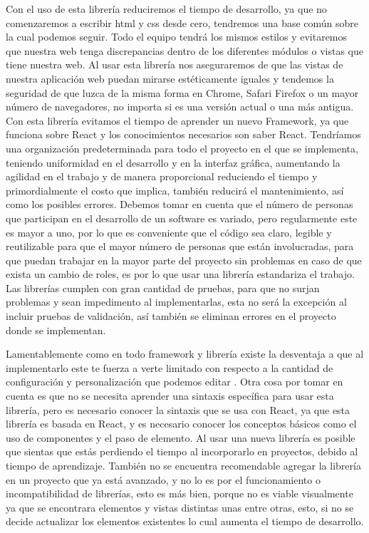 Con el uso de esta librería reduciremos el tiempo de desarrollo, ya que no comenzaremos a escribir html y  css desde cero, tendremos una base común sobre la cual podemos seguir. Todo el equipo tendrá los mismos estilos y evitaremos que nuestra web tenga discrepancias dentro de los diferentes módulos o vistas que tiene nuestra web. 
Al usar esta librería nos aseguraremos de que las vistas de nuestra aplicación web puedan mirarse estéticamente iguales y tendemos la seguridad de que luzca de la misma forma en Chrome, Safari Firefox o un mayor número de navegadores, no importa si es una versión actual o una más antigua. 
Con esta librería evitamos el tiempo de aprender un nuevo Framework, ya que funciona sobre React y los conocimientos necesarios son saber React. 
Tendríamos una organización predeterminada para todo el proyecto en el que se implementa, teniendo uniformidad en el desarrollo y en la interfaz gráfica, aumentando la agilidad en el trabajo y de manera proporcional reduciendo el tiempo y primordialmente el costo que implica, también reducirá el mantenimiento, así como los posibles errores. 
Debemos tomar en cuenta que el número de personas que participan en el desarrollo de un software es variado, pero regularmente este es mayor a uno, por lo que es conveniente que el código sea claro, legible y reutilizable para que el mayor número de personas que están involucradas, para que puedan trabajar en la mayor parte del proyecto sin problemas en caso de que exista un cambio de roles, es por lo que usar una librería estandariza el trabajo. 
Las librerías cumplen con gran cantidad de pruebas, para que no surjan problemas y sean impedimento al implementarlas, esta no será la excepción al incluir pruebas de validación, así también se eliminan errores en el proyecto donde se implementan. 
  
Lamentablemente como en todo framework y librería existe la desventaja a que al implementarlo este te fuerza a verte limitado con respecto a la cantidad de configuración y personalización que podemos editar \cite{newTech}. Otra cosa por tomar en cuenta es que no se necesita aprender una sintaxis específica para usar esta librería, pero es necesario conocer la sintaxis que se usa con React, ya que esta librería es basada en React, y es necesario conocer los conceptos básicos como el uso de componentes y el paso de elemento. Al usar una nueva librería es posible que sientas que estás perdiendo el tiempo al incorporarlo en proyectos, debido al tiempo de aprendizaje. También no se encuentra recomendable agregar la librería en un proyecto que ya está avanzado, y no lo es por el funcionamiento o incompatibilidad de librerías, esto es más bien, porque no es viable visualmente ya que se encontrara elementos y vistas distintas unas entre otras, esto, si no se decide actualizar los elementos existentes lo cual aumenta el tiempo de desarrollo.


